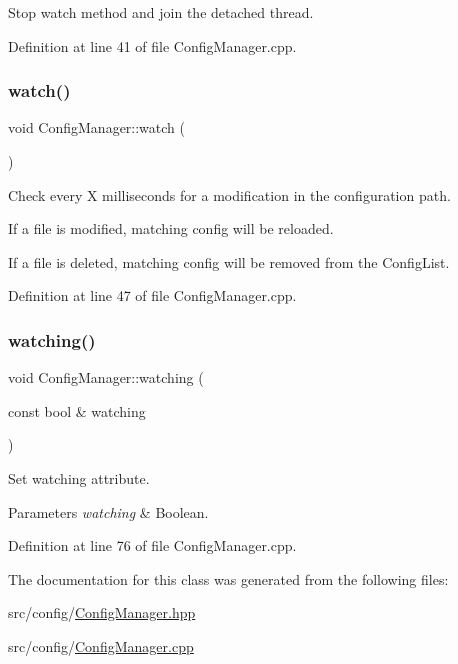Stop watch method and join the detached thread. 



Definition at line 41 of file Config\+Manager.\+cpp.

\mbox{\label{classcfg_1_1_config_manager_a31f95938b66f996b8e731dada6b4a880}} 
\subsubsection{\texorpdfstring{watch()}{watch()}}
{\footnotesize\ttfamily void Config\+Manager\+::watch (\begin{DoxyParamCaption}{ }\end{DoxyParamCaption})}



Check every X milliseconds for a modification in the configuration path. 


\begin{DoxyItemize}
\item If a file is modified, matching config will be reloaded.
\item If a file is deleted, matching config will be removed from the Config\+List. 
\end{DoxyItemize}

Definition at line 47 of file Config\+Manager.\+cpp.

\mbox{\label{classcfg_1_1_config_manager_a5c6d63489274c7ddeb88891caea5ca48}} 
\subsubsection{\texorpdfstring{watching()}{watching()}}
{\footnotesize\ttfamily void Config\+Manager\+::watching (\begin{DoxyParamCaption}\item[{const bool \&}]{watching }\end{DoxyParamCaption})}



Set watching attribute. 


\begin{DoxyParams}{Parameters}
{\em watching} & Boolean. \\
\hline
\end{DoxyParams}


Definition at line 76 of file Config\+Manager.\+cpp.



The documentation for this class was generated from the following files\+:\begin{DoxyCompactItemize}
\item 
src/config/\hyperlink{_config_manager_8hpp}{Config\+Manager.\+hpp}\item 
src/config/\hyperlink{_config_manager_8cpp}{Config\+Manager.\+cpp}\end{DoxyCompactItemize}
